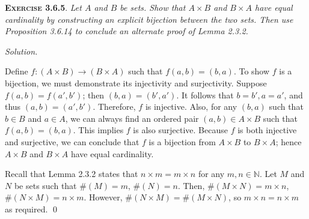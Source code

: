 \documentclass[12pt]{article}
\theoremstyle{remark}
\newenvironment{exer}[2]{
    \noindent \setlength{\parskip}{1em}%
    \textsc{\textbf{Exercise #1}}. \textit{#2} \par
    \noindent \textit{Solution.} %
}{\bigskip}
\begin{document}
\begin{exer}{3.6.5}{
    Let $A$ and $B$ be sets.
    Show that $A \times B$ and $B \times A$ have equal cardinality by constructing an explicit bijection between the two sets.
    Then use Proposition 3.6.14 to conclude an alternate proof of Lemma 2.3.2.
}
    Define $f : (A \times B) \to (B \times A)$ such that $f(a, b) = (b, a)$.
    To show $f$ is a bijection, we must demonstrate its injectivity and surjectivity.
    Suppose $f(a, b) = f(a', b')$; then $(b, a) = (b', a')$.
    It follows that $b = b', a = a'$, and thus $(a, b) = (a', b')$.
    Therefore, $f$ is injective.
    Also, for any $(b, a)$ such that $b \in B$ and $a \in A$, we can always find an ordered pair $(a, b) \in A \times B$ such that $f(a, b) = (b, a)$.
    This implies $f$ is also surjective.
    Because $f$ is both injective and surjective, we can conclude that $f$ is a bijection from $A \times B$ to $B \times A$; hence $A \times B$ and $B \times A$ have equal cardinality.

    Recall that Lemma 2.3.2 states that $n \times m = m \times n$ for any $m, n \in \mathbb{N}$.
    Let $M$ and $N$ be sets such that $\#(M) = m$, $\#(N) = n$.
    Then, $\#(M \times N) = m \times n$, $\#(N \times M) = n \times m$.
    However, $\#(N \times M) = \#(M \times N)$, so $m \times n = n \times m$ as required. \qed
\end{exer}
\end{document}

